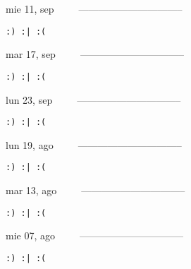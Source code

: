 \documentclass[letterpaper,10pt]{article}
\begin{document}
\begin{multicols}{3}
{mie 11, sep\ \ \ \ \ --------------------------------}
\begin{flushright}\begin{small}\texttt{:) :| :(}\end{small}\end{flushright}
\vfill
{mar 17, sep\ \ \ \ \ --------------------------------}
\begin{flushright}\begin{small}\texttt{:) :| :(}\end{small}\end{flushright}\par
\vfill
{lun 23, sep\ \ \ \ \ --------------------------------}
\begin{flushright}\begin{small}\texttt{:) :| :(}\end{small}\end{flushright}\par
\vfill
\end{multicols}
\vspace{1.05cm}

\begin{multicols}{3}
{lun 19, ago\ \ \ \ \ --------------------------------}
\begin{flushright}\begin{small}\texttt{:) :| :(}\end{small}\end{flushright}
\vfill
{mar 13, ago\ \ \ \ \ --------------------------------}
\begin{flushright}\begin{small}\texttt{:) :| :(}\end{small}\end{flushright}\par
\vfill
{mie 07, ago\ \ \ \ \ --------------------------------}
\begin{flushright}\begin{small}\texttt{:) :| :(}\end{small}\end{flushright}\par
\vfill
\end{multicols}
\vspace{1.05cm}
\end{document}
